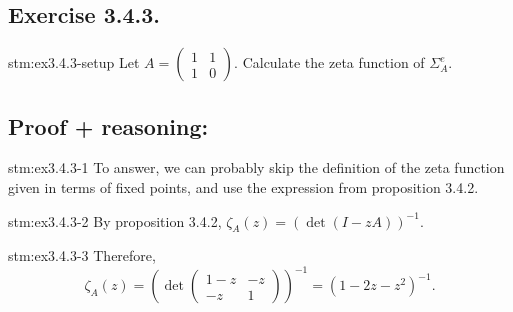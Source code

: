 \subsection*{Exercise 3.4.3.}

\begin{exercise}{stm:ex3.4.3-setup}
Let \( A = \begin{pmatrix} 1 & 1 \\ 1 & 0 \end{pmatrix} \). Calculate the zeta function of \( \Sigma^e_A \).
\end{exercise}

\subsection*{Proof {\color{blue}+ reasoning}:}

\begin{explanation}{stm:ex3.4.3-1}
To answer, we can probably skip the definition of the zeta function given in terms of fixed points, and use the expression from proposition 3.4.2.
\end{explanation}

\begin{statement}{stm:ex3.4.3-2}
By proposition 3.4.2, \(\zeta_A(z) = \left( \det(I - zA) \right)^{-1}\).
\end{statement}

\begin{statement}{stm:ex3.4.3-3}
Therefore, 
\[
\zeta_A(z) = \left( \det \begin{pmatrix} 1 - z & -z \\ -z & 1 \end{pmatrix} \right)^{-1} = \left( 1 - 2z - z^2 \right)^{-1}.
\]
\end{statement}
